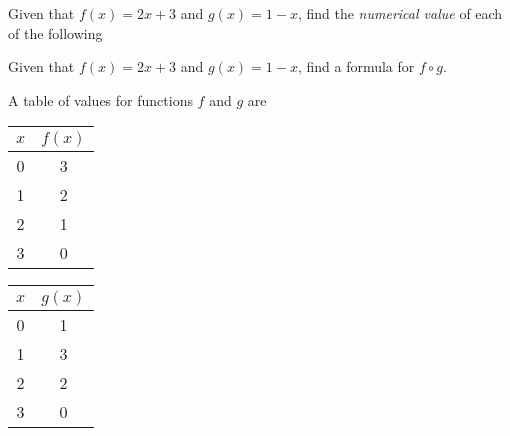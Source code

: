 \documentclass[12pt,fleqn]{exam}
\begin{document}
\begin{questions} 

\question Given that $f(x) = 2 x + 3$ and $g(x) = 1-x$, find the 
\emph{numerical value} of each of the following



\question [2] Given that $f(x) = 2 x + 3$ and $g(x) = 1-x$, find 
a formula for $f \circ g$.

\begin{solution}

\end{solution}
\hfill
\newpage 

\question A table of values for functions $f$ and $g$ are

\begin{tabular}[h]{|c|c|} 
  \hline
  $x$  & $f(x)$ \\ \hline \hline
  0    & 3 \\ \hline
  1    & 2 \\ \hline
  2    & 1 \\ \hline
  3    & 0 \\ \hline
\end{tabular} \phantom{xxxxxxx}
\begin{tabular}[h]{|c|c|} 
  \hline
  $x$  & $g(x)$ \\ \hline \hline
  0    & 1 \\ \hline
  1    & 3 \\ \hline
  2    & 2 \\ \hline
  3    & 0 \\ \hline
\end{tabular} 


\end{questions}
\end{document}
